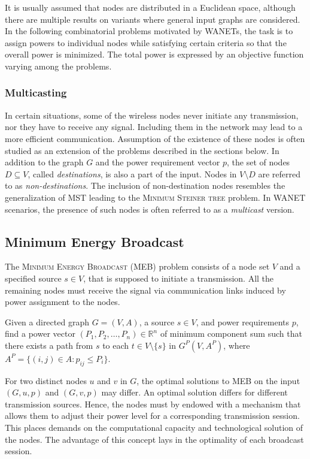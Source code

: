 It is usually assumed that nodes are distributed in a Euclidean space, although there are multiple results on variants where general input graphs are considered.
In the following combinatorial problems motivated by WANETs, the task is to assign powers to individual nodes while satisfying certain criteria so that the overall power is minimized.
The total power is expressed by an objective function varying among the problems.

\subsubsection{Multicasting}

In certain situations, some of the wireless nodes never initiate any transmission, nor they have to receive any signal.
Including them in the network may lead to a more efficient communication.
Assumption of the existence of these nodes is often studied as an extension of the problems described in the sections below.
In addition to the graph $G$ and the power requirement vector $p$, the set of nodes $D\subseteq V$, called \emph{destinations}, is also a part of the input.
Nodes in $V\setminus D$ are referred to as \emph{non-destinations}.
The inclusion of non-destination nodes resembles the generalization of MST leading to the \textsc{Minimum Steiner tree} problem.
In WANET scenarios, the presence of such nodes is often referred to as a \emph{multicast} version.

\subsection{Minimum Energy Broadcast}

The \textsc{Minimum Energy Broadcast} (MEB) problem consists of a node set $V$ and a specified source $s\in V$, that is supposed to initiate a transmission.
All the remaining nodes must receive the signal via communication links induced by power assignment to the nodes.
\begin{problem}\label{prob:meb1}
Given a directed graph $G=(V,A)$, a source $s\in V$, and power requirements $p$, find a power vector $(P_1,P_2,\dots,P_n)\in\mathbb{R}^n$ of minimum component sum such that
there exists a path from $s$ to each $t\in V\setminus\{s\}$ in $G^P(V,A^P)$, where $A^P=\{(i,j)\in A: p_{ij}\leq P_i\}$.
\end{problem}
For two distinct nodes $u$ and $v$  in $G$, the optimal solutions to MEB on the input $(G,u,p)$ and $(G,v,p)$ may differ.
An optimal solution differs for different transmission sources.
Hence, the nodes must by endowed with a mechanism that allows them to adjust their power level for a corresponding transmission session.
This places demands on the computational capacity and technological solution of the nodes.
The advantage of this concept lays in the optimality of each broadcast session.

